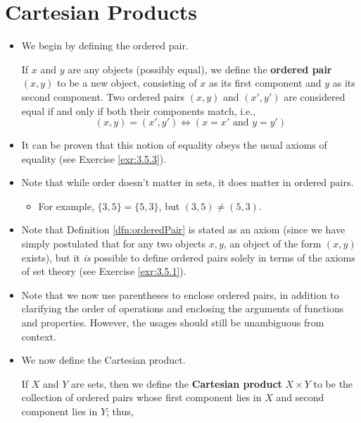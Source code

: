 \documentclass[../main.tex]{subfiles}
\begin{document}
\section{Cartesian Products}\label{sse:3.5}
\begin{itemize}
    \item We begin by defining the ordered pair.
    \begin{dfn}\label{dfn:orderedPair}
        If $x$ and $y$ are any objects (possibly equal), we define the \textbf{ordered pair} $(x,y)$ to be a new object, consisting of $x$ as its first component and $y$ as its second component. Two ordered pairs $(x,y)$ and $(x',y')$ are considered equal if and only if both their components match, i.e.,
        \begin{equation*}
            (x,y)=(x',y') \Longleftrightarrow (x=x'\text{ and }y=y')
        \end{equation*}
    \end{dfn}
    \item It can be proven that this notion of equality obeys the usual axioms of equality (see Exercise \ref{exr:3.5.3}).
    \item {}Note that while order doesn't matter in sets, it does matter in ordered pairs.
    \begin{itemize}
        \item For example, $\{3,5\}=\{5,3\}$, but $(3,5)\neq(5,3)$.
    \end{itemize}
    \item Note that Definition \ref{dfn:orderedPair} is stated as an axiom (since we have simply postulated that for any two objects $x,y$, an object of the form $(x,y)$ exists), but it \emph{is} possible to define ordered pairs solely in terms of the axioms of set theory (see Exercise \ref{exr:3.5.1}).
    \item {}Note that we now use parentheses to enclose ordered pairs, in addition to clarifying the order of operations and enclosing the arguments of functions and properties. However, the usages should still be unambiguous from context.
    \item We now define the Cartesian product.
    \begin{dfn}\label{dfn:cartesianProduct}
        If $X$ and $Y$ are sets, then we define the \textbf{Cartesian product} $X\times Y$ to be the collection of ordered pairs whose first component lies in $X$ and second component lies in $Y$; thus,
        \begin{equation*}

\end{equation*}
\end{dfn}
\end{itemize}
\end{document}
